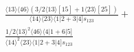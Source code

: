 \documentclass[varwidth, border=5pt]{standalone}
\begin{document}
\begin{my}
$\begin{gathered}
\scriptscriptstyle\frac{⟨13⟩⟨46⟩\scriptscriptstyle(3/2⟨13⟩[15]+1⟨23⟩[25])}{⟨14⟩⟨23⟩⟨1|2+3|4]s_{123}}+\\
\scriptscriptstyle\frac{1/2⟨13⟩^2⟨46⟩⟨4|1+6|5]}{⟨14⟩^2⟨23⟩⟨1|2+3|4]s_{123}}\phantom{+}
\end{gathered}$
\end{my}
\end{document}
